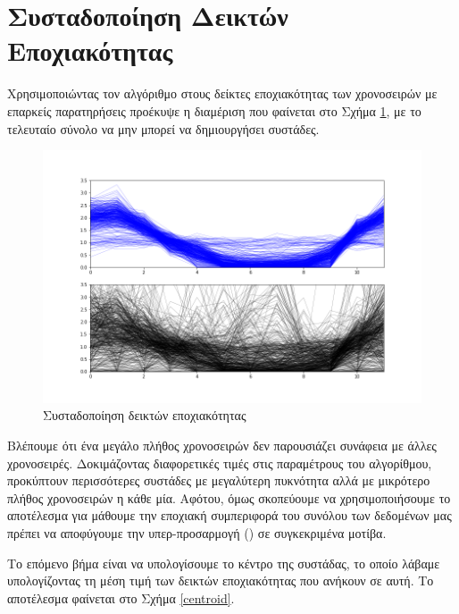 \section{Συσταδοποίηση Δεικτών Εποχιακότητας}

Χρησιμοποιώντας τον αλγόριθμο  στους δείκτες εποχιακότητας των χρονοσειρών με επαρκείς παρατηρήσεις προέκυψε η διαμέριση που φαίνεται στο Σχήμα \ref{DBSCANresults}, με το τελευταίο σύνολο να μην μπορεί να δημιουργήσει συστάδες.

\begin{figure}[t!]
  \includegraphics[scale=0.5]{figures/dbscan.png}
\centering
\caption{Συσταδοποίηση δεικτών εποχιακότητας}
\label{DBSCANresults}
\end{figure} 

Βλέπουμε ότι ένα μεγάλο πλήθος χρονοσειρών δεν παρουσιάζει συνάφεια με άλλες χρονοσειρές. Δοκιμάζοντας διαφορετικές τιμές στις παραμέτρους του αλγορίθμου, προκύπτουν περισσότερες συστάδες με μεγαλύτερη πυκνότητα αλλά με μικρότερο πλήθος χρονοσειρών η κάθε μία. Αφότου, όμως σκοπεύουμε να χρησιμοποιήσουμε το αποτέλεσμα για μάθουμε την εποχιακή συμπεριφορά του συνόλου των δεδομένων μας πρέπει να αποφύγουμε την υπερ-προσαρμογή () σε συγκεκριμένα μοτίβα.

Το επόμενο βήμα είναι να υπολογίσουμε το κέντρο της συστάδας, το οποίο λάβαμε υπολογίζοντας τη μέση τιμή των δεικτών εποχιακότητας που ανήκουν σε αυτή. Το αποτέλεσμα φαίνεται στο Σχήμα \ref{centroid}.


